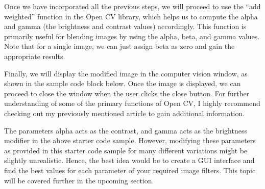 

\PYTHON{}




\medskip


Once we have incorporated all the previous steps, we will proceed to use the ``add weighted'' function in the Open CV library, which helps us to compute the alpha and gamma (the brightness and contrast values) accordingly. This function is primarily useful for blending images by using the alpha, beta, and gamma values. Note that for a single image, we can just assign beta as zero and gain the appropriate results.

Finally, we will display the modified image in the computer vision window, as shown in the sample code block below. Once the image is displayed, we can proceed to close the window when the user clicks the close button. For further understanding of some of the primary functions of Open CV, I highly recommend checking out my previously mentioned article to gain additional information.

\medskip



\PYTHON{}






\medskip

The parameters alpha acts as the contrast, and gamma acts as the brightness modifier in the above starter code sample. However, modifying these parameters as provided in this starter code sample for many different variations might be slightly unrealistic. Hence, the best idea would be to create a GUI interface and find the best values for each parameter of your required image filters. This topic will be covered further in the upcoming section.


